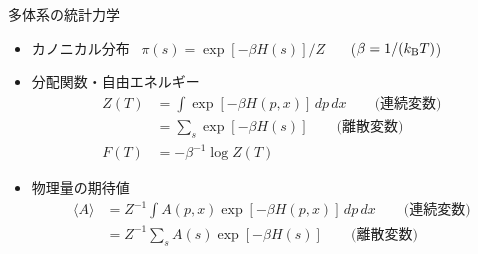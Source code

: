 
\begin{frame}[t,fragile]{多体系の統計力学}
  \begin{itemize}
  \item カノニカル分布 \ $\pi(s) = \exp [- \beta H(s) ] / Z$ \ \ \ ($\beta = 1/(k_{\rm B} T)$)
  \item 分配関数・自由エネルギー
    \begin{align*}
      Z(T) &= \int \exp [- \beta H(p,x) ] \, dp \, dx \qquad \text{(連続変数)} \\
      &= \sum_s \exp [- \beta H(s) ] \qquad \text{(離散変数)} \\
      F(T) &= - \beta^{-1} \log Z(T)
    \end{align*}
  \item 物理量の期待値
    \begin{align*}
      \langle A \rangle &= Z^{-1} \int A(p,x) \exp [- \beta H(p,x) ] \, dp \, dx \qquad \text{(連続変数)} \\
      &= Z^{-1} \sum_s A(s) \exp [- \beta H(s) ] \qquad \text{(離散変数)}
    \end{align*}
  \end{itemize}
\end{frame}
